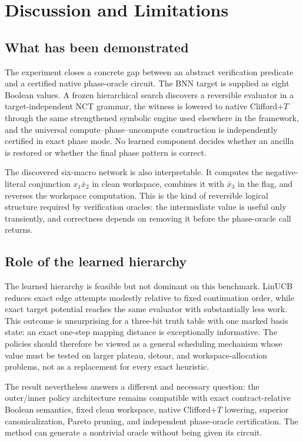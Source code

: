 \section{Discussion and Limitations}

\subsection{What has been demonstrated}

The experiment closes a concrete gap between an abstract verification predicate and a certified native phase-oracle circuit.  The BNN target is supplied as eight Boolean values.  A frozen hierarchical search discovers a reversible evaluator in a target-independent NCT grammar, the witness is lowered to native Clifford+$T$ through the same strengthened symbolic engine used elsewhere in the framework, and the universal compute--phase--uncompute construction is independently certified in exact phase mode.  No learned component decides whether an ancilla is restored or whether the final phase pattern is correct.

The discovered six-macro network is also interpretable.  It computes the negative-literal conjunction $x_1\bar x_2$ in clean workspace, combines it with $\bar x_3$ in the flag, and reverses the workspace computation.  This is the kind of reversible logical structure required by verification oracles: the intermediate value is useful only transiently, and correctness depends on removing it before the phase-oracle call returns.

\subsection{Role of the learned hierarchy}

The learned hierarchy is feasible but not dominant on this benchmark.  LinUCB reduces exact edge attempts modestly relative to fixed continuation order, while exact target potential reaches the same evaluator with substantially less work.  This outcome is unsurprising for a three-bit truth table with one marked basis state: an exact one-step mapping distance is exceptionally informative.  The policies should therefore be viewed as a general scheduling mechanism whose value must be tested on larger plateau, detour, and workspace-allocation problems, not as a replacement for every exact heuristic.

The result nevertheless answers a different and necessary question: the outer/inner policy architecture remains compatible with exact contract-relative Boolean semantics, fixed clean workspace, native Clifford+$T$ lowering, superior canonicalization, Pareto pruning, and independent phase-oracle certification.  The method can generate a nontrivial oracle without being given its circuit.

